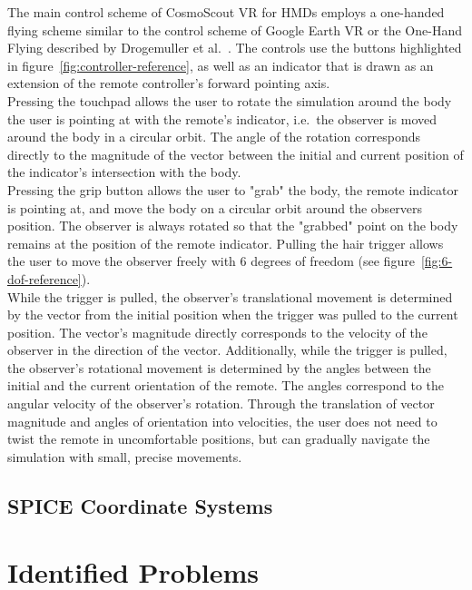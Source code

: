 The main control scheme of CosmoScout VR for HMDs employs a one-handed flying scheme similar to the control scheme of
Google Earth VR or the One-Hand Flying described by Drogemuller et al.~\cite{Drogemuller2020}.
The controls use the buttons highlighted in figure~\ref{fig:controller-reference}, as well as an indicator that is
drawn as an extension of the remote controller's forward pointing axis.
\\
Pressing the touchpad allows the user to rotate the simulation around the body the user is pointing at with the
remote's indicator, i.e.\ the observer is moved around the body in a circular orbit.
The angle of the rotation corresponds directly to the magnitude of the vector between the initial and current position
of the indicator's intersection with the body.
\\
Pressing the grip button allows the user to "grab" the body, the remote indicator is pointing at, and move the body
on a circular orbit around the observers position.
The observer is always rotated so that the "grabbed" point on the body remains at the position of the remote indicator.
Pulling the hair trigger allows the user to move the observer freely with 6 degrees of freedom (see
figure~\ref{fig:6-dof-reference}).
\\
While the trigger is pulled, the observer's translational movement is determined by the vector from the initial
position when the trigger was pulled to the current position.
The vector's magnitude directly corresponds to the velocity of the observer in the direction of the vector.
Additionally, while the trigger is pulled, the observer's rotational movement is determined by the angles between the
initial and the current orientation of the remote.
The angles correspond to the angular velocity of the observer's rotation.
Through the translation of vector magnitude and angles of orientation into velocities, the user does not need to
twist the remote in uncomfortable positions, but can gradually navigate the simulation with small, precise movements.

\subsection{SPICE Coordinate Systems}\label{subsec:spice-coordinate-systems}


\section{Identified Problems}\label{sec:identified-problems}

